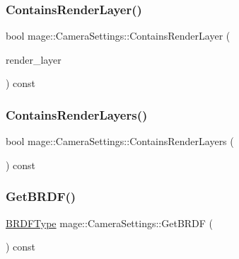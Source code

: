 \hypertarget{classmage_1_1_camera_settings_a9b5fd1fba981f92796d9b366cfba0023}{}\label{classmage_1_1_camera_settings_a9b5fd1fba981f92796d9b366cfba0023} 
\subsubsection{\texorpdfstring{Contains\+Render\+Layer()}{ContainsRenderLayer()}}
{\footnotesize\ttfamily bool mage\+::\+Camera\+Settings\+::\+Contains\+Render\+Layer (\begin{DoxyParamCaption}\item[{\hyperlink{namespacemage_a4091cc4d4d64a0fd31fd96c2ef7af761}{Render\+Layer}}]{render\+\_\+layer }\end{DoxyParamCaption}) const\hspace{0.3cm}{\ttfamily [noexcept]}}

\hypertarget{classmage_1_1_camera_settings_a696cbb2a11f4f8f4a8ab444c62ed46fd}{}\label{classmage_1_1_camera_settings_a696cbb2a11f4f8f4a8ab444c62ed46fd} 
\subsubsection{\texorpdfstring{Contains\+Render\+Layers()}{ContainsRenderLayers()}}
{\footnotesize\ttfamily bool mage\+::\+Camera\+Settings\+::\+Contains\+Render\+Layers (\begin{DoxyParamCaption}{ }\end{DoxyParamCaption}) const\hspace{0.3cm}{\ttfamily [noexcept]}}

\hypertarget{classmage_1_1_camera_settings_a31504f7e9b23404ee1b200561b8dd789}{}\label{classmage_1_1_camera_settings_a31504f7e9b23404ee1b200561b8dd789} 
\subsubsection{\texorpdfstring{Get\+B\+R\+D\+F()}{GetBRDF()}}
{\footnotesize\ttfamily \hyperlink{namespacemage_af1044f87544bc38427766a8c795d2f26}{B\+R\+D\+F\+Type} mage\+::\+Camera\+Settings\+::\+Get\+B\+R\+DF (\begin{DoxyParamCaption}{ }\end{DoxyParamCaption}) const\hspace{0.3cm}{\ttfamily [noexcept]}}

